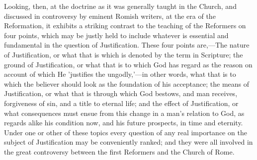 \documentclass[
]{book}
\begin{document}
Looking, then, at the doctrine as it was generally taught in the Church, and discussed in controversy by eminent Romish writers, at the era of the Reformation, it exhibits a striking contrast to the teaching of the Reformers on four points, which may be justly held to include whatever is essential and fundamental in the question of Justification. These four points are,---The nature of Justification, or what that is which is denoted by the term in Scripture; the ground of Justification, or what that is to which God has regard as the reason on account of which He 'justifies the ungodly,'---in other words, what that is to which the believer should look as the foundation of his acceptance; the means of Justification, or what that is through which God bestows, and man receives, forgiveness of sin, and a title to eternal life; and the effect of Justification, or what consequences must ensue from this change in a man's relation to God, as regards alike his condition now, and his future prospects, in time and eternity. Under one or other of these topics every question of any real importance on the subject of Justification may be conveniently ranked; and they were all involved in the great controversy between the first Reformers and the Church of Rome.
\end{document}

